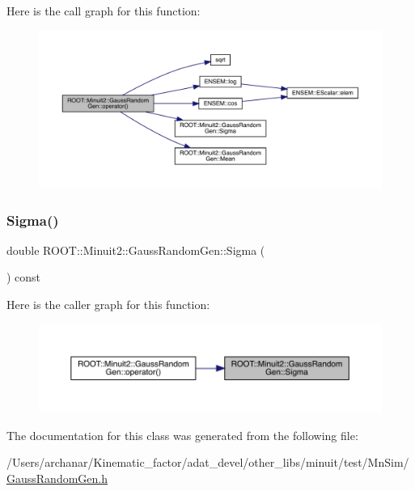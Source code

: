 Here is the call graph for this function\+:\nopagebreak
\begin{figure}[H]
\begin{center}
\leavevmode
\includegraphics[width=350pt]{d8/dd8/classROOT_1_1Minuit2_1_1GaussRandomGen_aaefcd8e04b3388314c9f14932a17a163_cgraph}
\end{center}
\end{figure}
\mbox{\label{classROOT_1_1Minuit2_1_1GaussRandomGen_a13d1989f3eced64b30a04788f8ed2cad}} 
\subsubsection{\texorpdfstring{Sigma()}{Sigma()}}
{\footnotesize\ttfamily double R\+O\+O\+T\+::\+Minuit2\+::\+Gauss\+Random\+Gen\+::\+Sigma (\begin{DoxyParamCaption}{ }\end{DoxyParamCaption}) const\hspace{0.3cm}{\ttfamily [inline]}}

Here is the caller graph for this function\+:\nopagebreak
\begin{figure}[H]
\begin{center}
\leavevmode
\includegraphics[width=350pt]{d8/dd8/classROOT_1_1Minuit2_1_1GaussRandomGen_a13d1989f3eced64b30a04788f8ed2cad_icgraph}
\end{center}
\end{figure}


The documentation for this class was generated from the following file\+:\begin{DoxyCompactItemize}
\item 
/\+Users/archanar/\+Kinematic\+\_\+factor/adat\+\_\+devel/other\+\_\+libs/minuit/test/\+Mn\+Sim/\mbox{\hyperlink{GaussRandomGen_8h}{Gauss\+Random\+Gen.\+h}}\end{DoxyCompactItemize}
